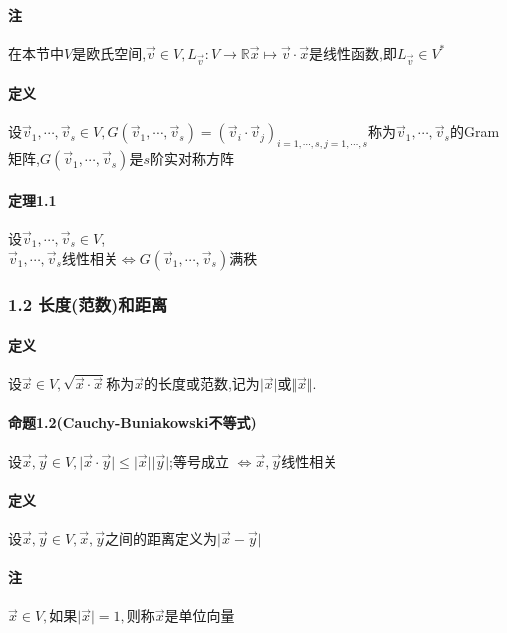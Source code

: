 \documentclass{ctexart}
\begin{document}
\paragraph{注}
在本节中$V$是欧氏空间,$\vec{v} \in V, L_{\vec{v}}:V \rightarrow \mathbb{R} \vec{x} \mapsto \vec{v}\cdot\vec{x}$是线性函数,即$L_{\vec{v}} \in V^{*}$

\paragraph{定义}
设$\vec{v}_{1},\cdots,\vec{v}_{s} \in V,G(\vec{v}_{1},\cdots,\vec{v}_{s})=(\vec{v}_{i}\cdot \vec{v}_{j})_{i=1,\cdots,s,j=1,\cdots,s}$称为$\vec{v}_{1},\cdots,\vec{v}_{s}$的Gram矩阵,$G(\vec{v}_{1},\cdots,\vec{v}_{s})$是$s$阶实对称方阵

\paragraph{定理1.1}
设$\vec{v}_{1},\cdots,\vec{v}_{s} \in V$,\\
$\vec{v}_{1},\cdots,\vec{v}_{s}$线性相关$\Leftrightarrow G(\vec{v}_{1},\cdots,\vec{v}_{s})$满秩

\subsubsection{1.2 长度(范数)和距离}

\paragraph{定义}
设$\vec{x} \in V, \sqrt{\vec{x}\cdot\vec{x}}$称为$\vec{x}$的长度或范数,记为$\vert \vec{x} \vert$或$\Vert \vec{x} \Vert$.

\paragraph{命题1.2(Cauchy-Buniakowski不等式)}

设$\vec{x},\vec{y} \in V,\vert \vec{x}\cdot \vec{y} \vert \le \vert \vec{x} \vert \vert \vec{y} \vert$;等号成立 $ \Leftrightarrow \vec{x},\vec{y}$线性相关

\paragraph{定义}
设$\vec{x},\vec{y} \in V,\vec{x},\vec{y}$之间的距离定义为$\vert \vec{x}-\vec{y} \vert$

\paragraph{注}
$\vec{x} \in V,$如果$\vert \vec{x}\vert = 1,$则称$\vec{x}$是单位向量
\end{document}
